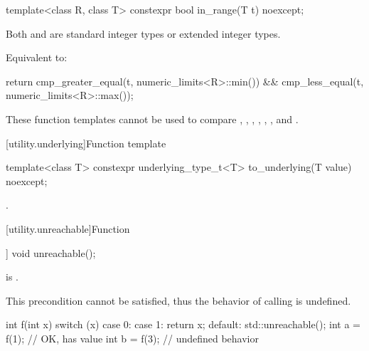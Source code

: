 %
\begin{itemdecl}
template<class R, class T>
  constexpr bool in_range(T t) noexcept;
\end{itemdecl}

\begin{itemdescr}
\pnum
\mandates
Both  and  are standard integer types or
extended integer types.

\pnum
\effects
Equivalent to:
\begin{codeblock}
return cmp_greater_equal(t, numeric_limits<R>::min()) &&
       cmp_less_equal(t, numeric_limits<R>::max());
\end{codeblock}
\end{itemdescr}

\pnum
\begin{note}
These function templates cannot be used to compare
,
,
,
,
,
, and
.
\end{note}

[utility.underlying]{Function template }

%
\begin{itemdecl}
template<class T>
  constexpr underlying_type_t<T> to_underlying(T value) noexcept;
\end{itemdecl}

\begin{itemdescr}
\pnum
\returns
{}.
\end{itemdescr}

[utility.unreachable]{Function }

%
\begin{itemdecl}
[[noreturn]] void unreachable();
\end{itemdecl}

\begin{itemdescr}
\pnum
\expects
{} is .
\begin{note}
This precondition cannot be satisfied, thus the behavior
of calling  is undefined.
\end{note}

\pnum
\begin{example}
\begin{codeblock}
int f(int x) {
  switch (x) {
  case 0:
  case 1:
    return x;
  default:
    std::unreachable();
  }
}
int a = f(1);           // OK,  has value 
int b = f(3);           // undefined behavior
\end{codeblock}
\end{example}
\end{itemdescr}

